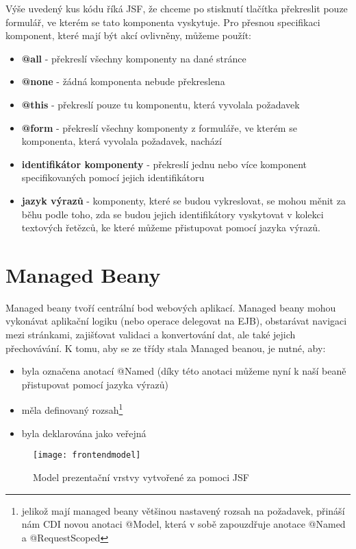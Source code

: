 \documentclass[122pt,oneside]{fithesis}
\begin{document}
Výše uvedený kus kódu říká JSF, že chceme po stisknutí tlačítka překreslit pouze formulář, ve kterém se tato komponenta vyskytuje. Pro přesnou specifikaci komponent, které mají být akcí ovlivněny, můžeme použít:
\begin{itemize}
  \item {\bf @all} - překreslí všechny komponenty na dané stránce 
  \item {\bf @none} - žádná komponenta nebude překreslena
  \item {\bf @this} - překreslí pouze tu komponentu, která vyvolala požadavek
  \item {\bf @form} - překreslí všechny komponenty z formuláře, ve kterém se komponenta, která vyvolala požadavek, nachází
  \item {\bf identifikátor komponenty} - překreslí jednu nebo více komponent specifikovaných pomocí jejich identifikátoru
  \item {\bf jazyk výrazů} - komponenty, které se budou vykreslovat, se mohou měnit za běhu podle toho, zda se budou jejich identifikátory vyskytovat v kolekci textových řetězců, ke které můžeme přistupovat pomocí jazyka výrazů.
\end{itemize}

\section{Managed Beany} 
Managed beany tvoří centrální bod webových aplikací. Managed beany mohou vykonávat aplikační logiku (nebo operace delegovat na EJB), obstarávat navigaci mezi stránkami, zajišťovat validaci a konvertování dat, ale také jejich přechovávání. K tomu, aby se ze třídy stala Managed beanou, je nutné, aby:
\begin{itemize}
  \item byla označena anotací @Named (díky této anotaci můžeme nyní k naší beaně přistupovat pomocí jazyka výrazů)
  \item měla definovaný rozsah\footnote[1]{jelikož mají managed beany většinou nastavený rozsah na požadavek, přináší nám CDI novou anotaci @Model, která v sobě zapouzdřuje anotace @Named a @RequestScoped}
  \item byla deklarována jako veřejná
\end{itemize}

\begin{figure}[!ht]
\centering
\texttt{[image: frontendmodel]}
\caption{Model prezentační vrstvy vytvořené za pomoci JSF}
\label{img:frontend}
\end{figure}
\end{document}
